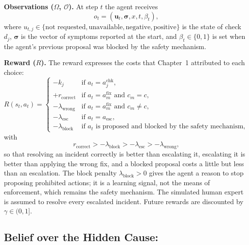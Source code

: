 \textbf{Observations ($\Omega$, $\mathcal{O}$).} At step $t$ the agent receives
\begin{equation}
o_t = (\mathbf{u}_t, \boldsymbol{\sigma}, x, t, \beta_t),
\end{equation}
where $u_{t,j} \in \{\text{not requested}, \text{unavailable}, \text{negative}, \text{positive}\}$ is the state of check $d_j$, $\boldsymbol{\sigma}$ is the vector of symptoms reported at the start, and $\beta_t \in \{0,1\}$ is set when the agent's previous proposal was blocked by the safety mechanism.

\textbf{Reward ($R$).} The reward expresses the costs that Chapter~1 attributed to each choice:
\begin{equation}
R(s_t, a_t) =
\begin{cases}
-k_j & \text{if } a_t = a^{\text{chk}}_j, \\
+r_{\text{correct}} & \text{if } a_t = a^{\text{fix}}_m \text{ and } c_m = c, \\
-\lambda_{\text{wrong}} & \text{if } a_t = a^{\text{fix}}_m \text{ and } c_m \neq c, \\
-\lambda_{\text{esc}} & \text{if } a_t = a_{\text{esc}}, \\
-\lambda_{\text{block}} & \text{if } a_t \text{ is proposed and blocked by the safety mechanism},
\end{cases}
\label{eq:reward}
\end{equation}
with
\begin{equation}
r_{\text{correct}} > -\lambda_{\text{block}} > -\lambda_{\text{esc}} > -\lambda_{\text{wrong}},
\label{eq:rewardorder}
\end{equation}
so that resolving an incident correctly is better than escalating it, escalating it is better than applying the wrong fix, and a blocked proposal costs a little but less than an escalation. The block penalty $\lambda_{\text{block}} > 0$ gives the agent a reason to stop proposing prohibited actions; it is a learning signal, not the means of enforcement, which remains the safety mechanism. The simulated human expert is assumed to resolve every escalated incident. Future rewards are discounted by $\gamma \in (0, 1]$.

\subsection{Belief over the Hidden Cause:}

